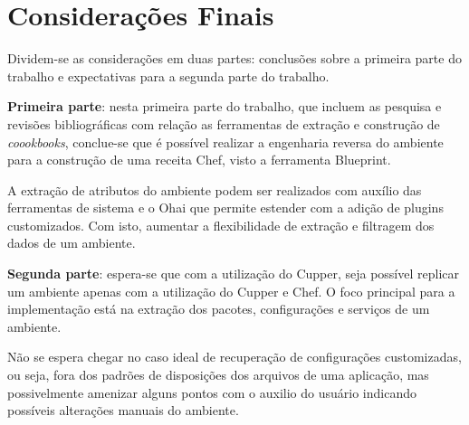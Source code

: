 \newpage\null\thispagestyle{empty}\newpage
\chapter{Considerações Finais}
\label{chap:result-parc}

Dividem-se as considerações em duas partes: conclusões
sobre a primeira parte do trabalho e expectativas para
a segunda parte do trabalho.

\textbf{Primeira parte}: nesta primeira parte do trabalho, que
incluem as pesquisa e revisões bibliográficas com relação
as ferramentas de extração e construção de \textit{coookbooks},
conclue-se que é possível realizar a engenharia reversa do
ambiente para a construção de uma receita Chef, visto a
ferramenta Blueprint.

A extração de atributos do ambiente podem ser realizados
com auxílio das ferramentas de sistema e o Ohai que permite
estender com a adição de plugins customizados. Com isto,
aumentar a flexibilidade de extração e filtragem dos dados
de um ambiente.

\textbf{Segunda parte}: espera-se que com a utilização do Cupper,
seja possível replicar um ambiente apenas com a utilização
do Cupper e Chef. O foco principal para a implementação
está na extração dos pacotes, configurações e serviços
de um ambiente.

Não se espera chegar no caso ideal de
recuperação de configurações customizadas, ou seja, fora
dos padrões de disposições dos arquivos de uma aplicação,
mas possivelmente amenizar alguns pontos com o auxilio do
usuário indicando possíveis alterações manuais do ambiente.


